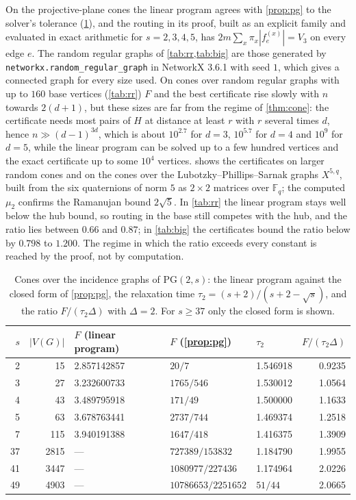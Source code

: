 \documentclass[11pt]{amsart}
\theoremstyle{definition}
\newcommand{\F}{\mathbb{F}}
\newcommand{\PG}{\mathrm{PG}}
\begin{document}
On the projective-plane cones the linear program agrees with \cref{prop:pg} to the solver's tolerance (\cref{tab:pg}), and the routing in its proof, built as an explicit family and evaluated in exact arithmetic for $s=2,3,4,5$, has $2m\sum_x\pi_x|f^{(x)}_e|=V_3$ on every edge $e$. The random regular graphs of \cref{tab:rr,tab:big} are those generated by \texttt{networkx.random\_regular\_graph} in NetworkX 3.6.1 with seed $1$, which gives a connected graph for every size used. On cones over random regular graphs with up to $160$ base vertices (\cref{tab:rr}) $F$ and the best certificate rise slowly with $n$ towards $2(d+1)$, but these sizes are far from the regime of \cref{thm:cone}: the certificate needs most pairs of $H$ at distance at least $r$ with $r$ several times $d$, hence $n\gg(d-1)^{3d}$, which is about $10^{2.7}$ for $d=3$, $10^{5.7}$ for $d=4$ and $10^9$ for $d=5$, while the linear program can be solved up to a few hundred vertices and the exact certificate up to some $10^4$ vertices.  shows the certificates on larger random cones and on the cones over the Lubotzky--Phillips--Sarnak graphs $X^{5,q}$, built from the six quaternions of norm $5$ as $2\times2$ matrices over $\F_q$; the computed $\mu_2$ confirms the Ramanujan bound $2\sqrt5$. In \cref{tab:rr} the linear program stays well below the hub bound, so routing in the base still competes with the hub, and the ratio lies between $0.66$ and $0.87$; in \cref{tab:big} the certificates bound the ratio below by $0.798$ to $1.200$. The regime in which the ratio exceeds every constant is reached by the proof, not by computation.

\begin{table}[ht]
\centering
\caption{Cones over the incidence graphs of $\PG(2,s)$: the linear program against the closed form of \cref{prop:pg}, the relaxation time $\tau_2=(s+2)/(s+2-\sqrt s)$, and the ratio $F/(\tau_2\Delta)$ with $\Delta=2$. For $s\ge37$ only the closed form is shown.}\label{tab:pg}
\begin{tabular}{rrlllr}
\toprule
$s$ & $|V(G)|$ & $F$ (linear program) & $F$ (\cref{prop:pg}) & $\tau_2$ & $F/(\tau_2\Delta)$\\
\midrule
2 & 15 & 2.857142857 & $20/7$ & 1.546918 & 0.9235\\
3 & 27 & 3.232600733 & $1765/546$ & 1.530012 & 1.0564\\
4 & 43 & 3.489795918 & $171/49$ & 1.500000 & 1.1633\\
5 & 63 & 3.678763441 & $2737/744$ & 1.469374 & 1.2518\\
7 & 115 & 3.940191388 & $1647/418$ & 1.416375 & 1.3909\\
37 & 2815 & --- & $727389/153832$ & 1.184790 & 1.9955\\
41 & 3447 & --- & $1080977/227436$ & 1.174964 & 2.0226\\
49 & 4903 & --- & $10786653/2251652$ & $51/44$ & 2.0665\\
\bottomrule
\end{tabular}
\end{table}
\end{document}
